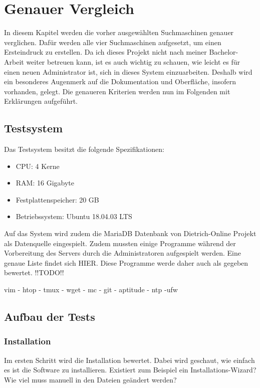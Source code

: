 \chapter{Genauer Vergleich}

In diesem Kapitel werden die vorher ausgewählten Suchmaschinen genauer verglichen. Dafür werden alle vier Suchmaschinen aufgesetzt, um einen Ersteindruck zu erstellen. Da ich dieses Projekt nicht nach meiner Bachelor-Arbeit weiter betreuen kann, ist es auch wichtig zu schauen, wie leicht  es für einen neuen Administrator ist, sich in dieses System einzuarbeiten. Deshalb wird ein besonderes Augenmerk auf die Dokumentation und Oberfläche, insofern vorhanden, gelegt. Die genaueren Kriterien werden nun im Folgenden mit Erklärungen aufgeführt.

\section{Testsystem}
Das Testsystem besitzt die folgende Spezifikationen:

\begin{itemize}
    \item CPU: 4 Kerne
    \item RAM: 16 Gigabyte
    \item Festplattenspeicher: 20 GB
    \item Betriebssystem: Ubuntu 18.04.03 LTS
\end{itemize} 

Auf das System wird zudem die MariaDB Datenbank von Dietrich-Online Projekt als Datenquelle eingespielt. Zudem mussten einige Programme während der Vorbereitung des Servers durch die Administratoren aufgespielt werden. Eine genaue Liste findet sich HIER. Diese Programme werde daher auch als gegeben bewertet. !!TODO!!

vim       - htop       - tmux       - wget       - mc       - git       - aptitude    - ntp  -ufw 

\section{Aufbau der Tests}

\subsection{Installation}

Im ersten Schritt wird die Installation bewertet. Dabei wird geschaut, wie einfach es ist die Software zu installieren. Existiert zum Beispiel ein Installations-Wizard?Wie viel muss manuell in den Dateien geändert werden?

